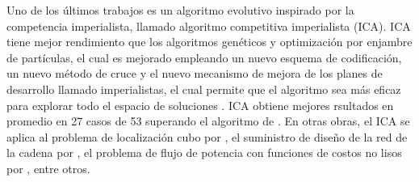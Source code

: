Uno de los últimos trabajos es un algoritmo evolutivo inspirado por la competencia imperialista, llamado algoritmo competitiva imperialista (ICA). ICA tiene mejor rendimiento que los algoritmos genéticos y optimización por enjambre de partículas, el cual es mejorado empleando un nuevo esquema de codificación, un nuevo método de cruce y el nuevo mecanismo de mejora de los planes de desarrollo llamado imperialistas, el cual permite que el algoritmo sea más eficaz para explorar todo el espacio de soluciones \citep{ardalan2015novel}. ICA obtiene mejores rsultados en promedio en 27 casos de 53 superando el algoritmo de \cite{snyder2006random}. En otras obras, el ICA se aplica al problema de localización cubo por \cite{mohammadi2014sustainable}, el suministro de diseño de la red de la cadena por \cite{devika2014designing}, el problema de flujo de potencia con funciones de costos no lisos por \cite{ghasemi2014novel}, entre otros.




